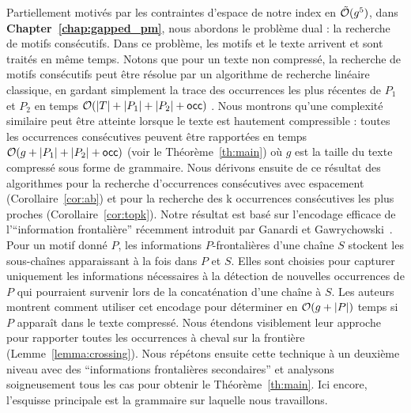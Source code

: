 Partiellement motivés par les contraintes d'espace de notre index en $\tilde {\mathcal{O}}(g^5)$, dans \textbf{Chapter~\ref{chap:gapped_pm}}, nous abordons le problème dual : la recherche de motifs consécutifs.  Dans ce problème, les motifs et le texte arrivent et sont traités en même temps. Notons que pour un texte non compressé, la recherche de motifs consécutifs peut être résolue par un algorithme de recherche linéaire classique, en gardant simplement la trace des occurrences les plus récentes de $P_1$ et $P_2$ en temps $\mathcal{O}(|T|+|P_1|+|P_2|+\mathsf{occ})$ .
Nous montrons qu'une complexité similaire peut être atteinte lorsque le texte est hautement compressible : toutes les occurrences consécutives peuvent être rapportées en temps $\mathcal{O}(g+|P_1|+|P_2|+\mathsf{occ})$  (voir le Théorème~\ref{th:main}) où $g$ est la taille du texte compressé sous forme de grammaire. Nous dérivons ensuite de ce résultat des algorithmes pour la recherche d'occurrences consécutives avec espacement (Corollaire~\ref{cor:ab}) et pour la recherche des k occurrences consécutives les plus proches (Corollaire~\ref{cor:topk}).
%
Notre résultat est basé sur l'encodage efficace de l'``information frontalière'' récemment introduit par Ganardi et Gawrychowski~\cite{DBLP:conf/soda/GanardiG22}. Pour un motif donné $P$, les informations  $P$-frontalières d'une chaîne $S$ stockent les sous-chaînes apparaissant à la fois dans $P$ et $S$. Elles sont choisies pour capturer uniquement les informations nécessaires à la détection de nouvelles occurrences de $P$ qui pourraient survenir lors de la concaténation d'une chaîne à $S$. 
%
Les auteurs montrent comment utiliser cet encodage pour déterminer en $\mathcal{O}(g+|P|)$ temps si $P$ apparaît dans le texte compressé. Nous étendons visiblement leur approche pour rapporter toutes les occurrences à cheval sur  la frontière (Lemme~\ref{lemma:crossing}). Nous répétons ensuite cette technique à un deuxième niveau avec des ``informations frontalières secondaires'' et analysons soigneusement tous les cas pour obtenir le Théorème~\ref{th:main}. Ici encore, l'esquisse principale est la grammaire sur laquelle nous travaillons.\\


